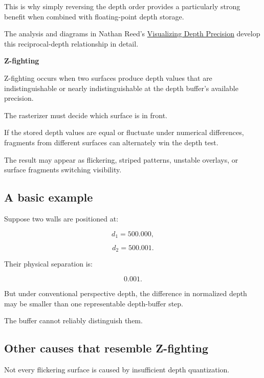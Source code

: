This is why simply reversing the depth order provides a particularly strong benefit when combined with floating-point depth storage.

The analysis and diagrams in Nathan Reed's \href{https://developer.nvidia.com/blog/visualizing-depth-precision/?utm_source=chatgpt.com}{Visualizing Depth Precision} develop this reciprocal-depth relationship in detail. 

\textbf{Z-fighting}

Z-fighting occurs when two surfaces produce depth values that are indistinguishable or nearly indistinguishable at the depth buffer's available precision.

The rasterizer must decide which surface is in front.

If the stored depth values are equal or fluctuate under numerical differences, fragments from different surfaces can alternately win the depth test.

The result may appear as flickering, striped patterns, unstable overlays, or surface fragments switching visibility.

\subsection{A basic example}\label{02-foundations-ii-ch033-a-basic-example}

\hypertarget{02-foundations-ii-ch033-a-basic-example}{}

Suppose two walls are positioned at:

\[
 d_1=500.000,
\]

\[
 d_2=500.001.
\]

Their physical separation is:

\[
 0.001.
\]

But under conventional perspective depth, the difference in normalized depth may be smaller than one representable depth-buffer step.

The buffer cannot reliably distinguish them.

\subsection{Other causes that resemble Z-fighting}\label{02-foundations-ii-ch033-other-causes-that-resemble-z-fighting}

\hypertarget{02-foundations-ii-ch033-other-causes-that-resemble-z-fighting}{}

Not every flickering surface is caused by insufficient depth quantization.

